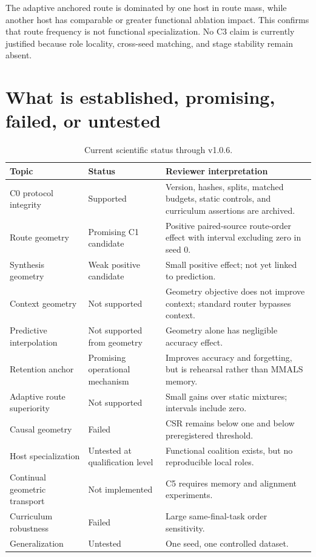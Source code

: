 \documentclass[11pt,a4paper]{article}
\begin{document}
The adaptive anchored route is dominated by one host in route mass, while another host has comparable or greater functional ablation impact. This confirms that route frequency is not functional specialization. No C3 claim is currently justified because role locality, cross-seed matching, and stage stability remain absent.

\section{What is established, promising, failed, or untested}

\begin{table}[H]
\centering
\small
\begin{tabularx}{\textwidth}{p{3.2cm}p{2.2cm}Y}
\toprule
\textbf{Topic} & \textbf{Status} & \textbf{Reviewer interpretation}\\
\midrule
C0 protocol integrity & Supported & Version, hashes, splits, matched budgets, static controls, and curriculum assertions are archived.\\
Route geometry & Promising C1 candidate & Positive paired-source route-order effect with interval excluding zero in seed 0.\\
Synthesis geometry & Weak positive candidate & Small positive effect; not yet linked to prediction.\\
Context geometry & Not supported & Geometry objective does not improve context; standard router bypasses context.\\
Predictive interpolation & Not supported from geometry & Geometry alone has negligible accuracy effect.\\
Retention anchor & Promising operational mechanism & Improves accuracy and forgetting, but is rehearsal rather than MMALS memory.\\
Adaptive route superiority & Not supported & Small gains over static mixtures; intervals include zero.\\
Causal geometry & Failed & CSR remains below one and below preregistered threshold.\\
Host specialization & Untested at qualification level & Functional coalition exists, but no reproducible local roles.\\
Continual geometric transport & Not implemented & C5 requires memory and alignment experiments.\\
Curriculum robustness & Failed & Large same-final-task order sensitivity.\\
Generalization & Untested & One seed, one controlled dataset.\\
\bottomrule
\end{tabularx}
\caption{Current scientific status through v1.0.6.}
\end{table}
\end{document}
